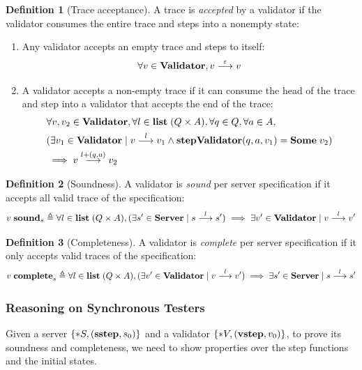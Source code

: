 \documentclass{article}
\theoremstyle{definition}
\newtheorem{definition}{Definition}
\newcommand{\existT}[2]{\{*#1,#2\}}
\newcommand{\Server}{\ottkw{Server}}
\newcommand{\Validator}{\ottkw{Validator}}
\newcommand{\stepValidator}{\ottkw{stepValidator}}
\newcommand{\sstep}{\ottkw{sstep}}
\newcommand{\vstep}{\ottkw{vstep}}
\newcommand{\Some}[1]{\ottkw{Some}\;#1}
\newcommand{\List}{\ottkw{list}\;}
\newcommand{\nil}{\varepsilon}
\newcommand{\yields}[3]{#1\overset{#2}{\longrightarrow}#3}
\newcommand{\accepts}[3]{#1\overset{#2}{\longrightarrow}#3}
\newcommand{\sound}{\ottkw{sound}}
\newcommand{\issound}[2]{#1\;\sound_{#2}}
\newcommand{\complete}{\ottkw{complete}}
\newcommand{\iscomplete}[2]{#1\;\complete_{#2}}
\begin{document}
\begin{definition}[Trace acceptance]
  A trace is {\em accepted} by a validator if the validator consumes the entire
  trace and steps into a nonempty state:
  \begin{enumerate}
  \item Any validator accepts an empty trace and steps to itself:
    \[ \forall v\in\Validator,\accepts{v}{\nil}{v} \]
  \item A validator accepts a non-empty trace if it can consume the head of the
    trace and step into a validator that accepts the end of the trace:
    \begin{align*}
      &\forall v,v_2\in\Validator,\forall
      l\in\List(Q\times A),\forall q\in Q, \forall a\in A, \\
      & (\exists v_1\in\Validator\mid\accepts{v}{l}{v_1}\wedge
      \stepValidator(q,a,v_1)=\Some{v_2}) \\ &\implies
      \accepts{v}{l+(q,a)}{v_2}
    \end{align*}
  \end{enumerate}
\end{definition}

\begin{definition}[Soundness]
  A validator is {\em sound} per server specification if it accepts all valid
  trace of the specification:
  \[ \issound{v}{s}\triangleq\forall l\in\List(Q\times A),(\exists s'\in\Server\mid\yields{s}{l}{s'})\implies\exists v'\in\Validator\mid\accepts{v}{l}{v'} \]
\end{definition}

\begin{definition}[Completeness]
  A validator is {\em complete} per server specification if it only accepts valid
  traces of the specification:
  \[ \iscomplete{v}{s}\triangleq\forall l\in \List(Q\times A),(\exists{v'}\in\Validator\mid\accepts{v}{l}{v'})\implies\exists{s'}\in\Server\mid\yields{s}{l}{s'} \]
\end{definition}

\subsubsection{Reasoning on Synchronous Testers}
\label{sec:sync-reasoning}

Given a server $\existT{S}{(\sstep, s_0)}$ and a validator
$\existT{V}{(\vstep,v_0)}$, to prove its soundness and completeness, we need to
show properties over the step functions and the initial states.
\end{document}
